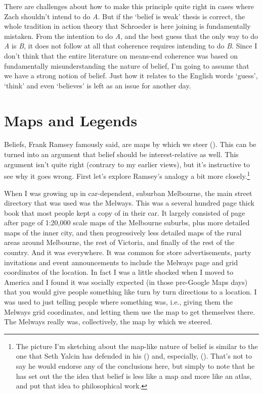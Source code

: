 \documentclass[
  12pt,
  letterpaper,
]{scrbook}
\begin{document}
There are challenges about how to make this principle quite right in
cases where Zach shouldn't intend to do \emph{A}. But if the `belief is
weak' thesis is correct, the whole tradition in action theory that
Schroeder is here joining is fundamentally mistaken. From the intention
to do \emph{A}, and the best guess that the only way to do \emph{A} is
\emph{B}, it does not follow at all that coherence requires intending to
do \emph{B}. Since I don't think that the entire literature on means-end
coherence was based on fundamentally misunderstanding the nature of
belief, I'm going to assume that we have a strong notion of belief. Just
how it relates to the English words `guess', `think' and even `believes'
is left as an issue for another day.

\section{Maps and Legends}\label{sec-mapslegends}

Beliefs, Frank Ramsey famously said, are maps by which we steer
(). This can be
turned into an argument that belief should be interest-relative as well.
This argument isn't quite right (contrary to my earlier views), but it's
instructive to see why it goes wrong. First let's explore Ramsey's
analogy a bit more closely.\footnote{The picture I'm sketching about the
  map-like nature of belief is similar to the one that Seth Yalcin has
  defended in his () and, especially,
  (). That's not to say he would endorse
  any of the conclusions here, but simply to note that he has set out
  the the idea that belief is less like a map and more like an atlas,
  and put that idea to philosophical work.}

When I was growing up in car-dependent, suburban Melbourne, the main
street directory that was used was the Melways. This was a several
hundred page thick book that most people kept a copy of in their car. It
largely consisted of page after page of 1:20,000 scale maps of the
Melbourne suburbs, plus more detailed maps of the inner city, and then
progressively less detailed maps of the rural areas around Melbourne,
the rest of Victoria, and finally of the rest of the country. And it was
everywhere. It was common for store advertisements, party invitations
and event announcements to include the Melways page and grid coordinates
of the location. In fact I was a little shocked when I moved to America
and I found it was socially expected (in those pre-Google Maps days)
that you would give people something like turn by turn directions to a
location. I was used to just telling people where something was, i.e.,
giving them the Melways grid coordinates, and letting them use the map
to get themselves there. The Melways really was, collectively, the map
by which we steered.
\end{document}
